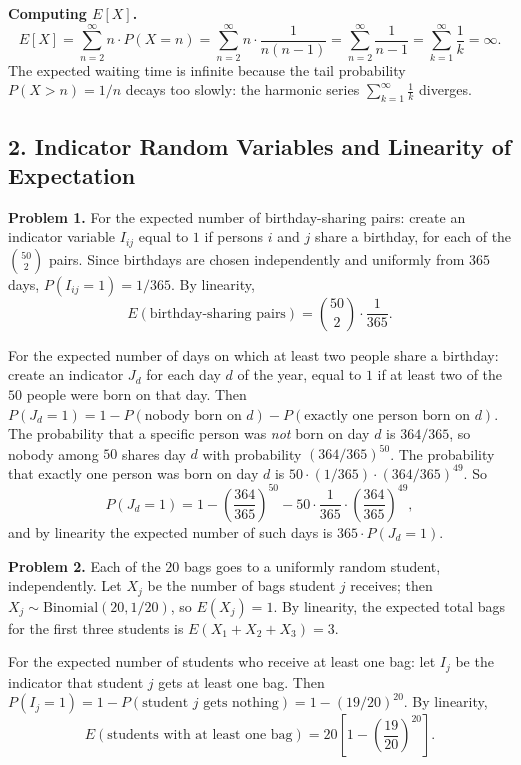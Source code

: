 \documentclass{article}
\begin{document}
\bigskip
\textbf{Computing $E[X]$.}
\[
  E[X]
  = \sum_{n=2}^{\infty} n \cdot P(X = n)
  = \sum_{n=2}^{\infty} n \cdot \frac{1}{n(n-1)}
  = \sum_{n=2}^{\infty} \frac{1}{n-1}
  = \sum_{k=1}^{\infty} \frac{1}{k}
  = \infty.
\]
The expected waiting time is infinite because the tail probability $P(X > n) = 1/n$ decays too slowly: the harmonic series $\sum_{k=1}^{\infty} \frac{1}{k}$ diverges.

\subsection*{2. Indicator Random Variables and Linearity of Expectation}

\textbf{Problem 1.} For the expected number of birthday-sharing pairs: create an indicator variable $I_{ij}$ equal to $1$ if persons $i$ and $j$ share a birthday, for each of the $\binom{50}{2}$ pairs. Since birthdays are chosen independently and uniformly from $365$ days, $P(I_{ij}=1)=1/365$. By linearity,
$$
E\!\left(\text{birthday-sharing pairs}\right) = \binom{50}{2}\cdot\frac{1}{365}.
$$

For the expected number of days on which at least two people share a birthday: create an indicator $J_d$ for each day $d$ of the year, equal to $1$ if at least two of the $50$ people were born on that day. Then $P(J_d=1)=1-P(\text{nobody born on }d)-P(\text{exactly one person born on }d)$. The probability that a specific person was \emph{not} born on day $d$ is $364/365$, so nobody among $50$ shares day $d$ with probability $(364/365)^{50}$. The probability that exactly one person was born on day $d$ is $50\cdot(1/365)\cdot(364/365)^{49}$. So
$$
P(J_d=1)=1-\left(\frac{364}{365}\right)^{50}-50\cdot\frac{1}{365}\cdot\left(\frac{364}{365}\right)^{49},
$$
and by linearity the expected number of such days is $365\cdot P(J_d=1)$.

\bigskip
\textbf{Problem 2.} Each of the $20$ bags goes to a uniformly random student, independently. Let $X_j$ be the number of bags student $j$ receives; then $X_j\sim\text{Binomial}(20,1/20)$, so $E(X_j)=1$. By linearity, the expected total bags for the first three students is $E(X_1+X_2+X_3)=3$.

For the expected number of students who receive at least one bag: let $I_j$ be the indicator that student $j$ gets at least one bag. Then $P(I_j=1)=1-P(\text{student }j\text{ gets nothing})=1-(19/20)^{20}$. By linearity,
$$
E\!\left(\text{students with at least one bag}\right)=20\left[1-\left(\frac{19}{20}\right)^{20}\right].
$$
\end{document}
